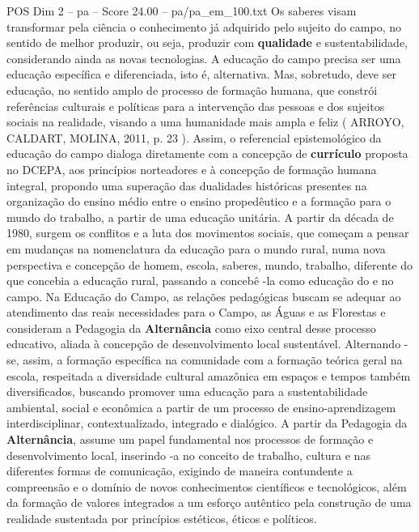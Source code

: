 \begin{textsample}{POS Dim 2 – pa – Score 24.00 – pa/pa\_em\_100.txt}
Os saberes visam transformar pela ciência o conhecimento já adquirido pelo sujeito do campo, no sentido de melhor produzir, ou seja, produzir com \textbf{qualidade} e sustentabilidade, considerando ainda as novas tecnologias.
A educação do campo precisa ser uma educação específica e diferenciada, isto é, alternativa.
Mas, sobretudo, deve ser educação, no sentido amplo de processo de formação humana, que constrói referências culturais e políticas para a intervenção das pessoas e dos sujeitos sociais na realidade, visando a uma humanidade mais ampla e feliz ( ARROYO, CALDART, MOLINA, 2011, p. 23 ).
Assim, o referencial epistemológico da educação do campo dialoga diretamente com a concepção de \textbf{currículo} proposta no DCEPA, aos princípios norteadores e à concepção de formação humana integral, propondo uma superação das dualidades históricas presentes na organização do ensino médio entre o ensino propedêutico e a formação para o mundo do trabalho, a partir de uma educação unitária.
A partir da década de 1980, surgem os conflitos e a luta dos movimentos sociais, que começam a pensar em mudanças na nomenclatura da educação para o mundo rural, numa nova perspectiva e concepção de homem, escola, saberes, mundo, trabalho, diferente do que concebia a educação rural, passando a concebê -la como educação do e no campo.
Na Educação do Campo, as relações pedagógicas buscam se adequar ao atendimento das reais necessidades para o Campo, as Águas e as Florestas e consideram a Pedagogia da \textbf{Alternância} como eixo central desse processo educativo, aliada à concepção de desenvolvimento local sustentável.
Alternando -se, assim, a formação específica na comunidade com a formação teórica geral na escola, respeitada a diversidade cultural amazônica em espaços e tempos também diversificados, buscando promover uma educação para a sustentabilidade ambiental, social e econômica a partir de um processo de ensino-aprendizagem interdisciplinar, contextualizado, integrado e dialógico.
A partir da Pedagogia da \textbf{Alternância}, assume um papel fundamental nos processos de formação e desenvolvimento local, inserindo -a no conceito de trabalho, cultura e nas diferentes formas de comunicação, exigindo de maneira contundente a compreensão e o domínio de novos conhecimentos científicos e tecnológicos, além da formação de valores integrados a um esforço autêntico pela construção de uma realidade sustentada por princípios estéticos, éticos e políticos.

\end{textsample}
